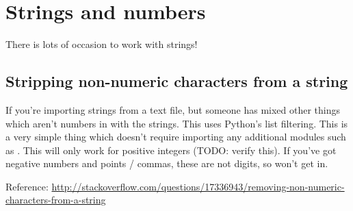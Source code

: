 \chapter{Strings and numbers}

There is lots of occasion to work with strings!

\section{Stripping non-numeric characters from a string}

If you're importing strings from a text file, but someone has mixed other things which aren't numbers in with the strings.
This uses Python's list filtering. This is a very simple thing which doesn't require importing any additional modules such as . This will only work for positive integers (TODO: verify this). If you've got negative numbers and points / commas, these are not digits, so won't get in.%

Reference:
\url{http://stackoverflow.com/questions/17336943/removing-non-numeric-characters-from-a-string}

